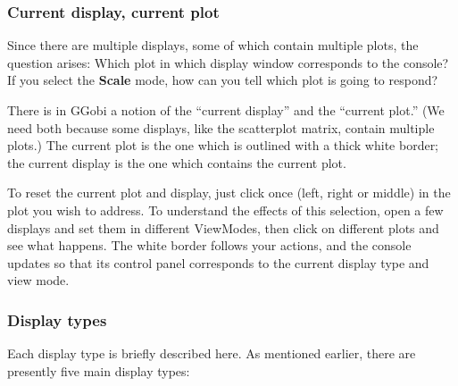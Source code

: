 \documentclass[11pt]{article}
\begin{document}
\subsubsection{Current display, current plot}

Since there are multiple displays, some of which contain multiple
plots, the question arises:  Which plot in which display window
corresponds to the console?  If you select the {\bf Scale} mode,
how can you tell which plot is going to respond?

There is in GGobi a notion of the ``current display'' and the
``current plot.''  (We need both because some displays, like the
scatterplot matrix, contain multiple plots.) The current plot is the
one which is outlined with a thick white border; the current display
is the one which contains the current plot.

To reset the current plot and display, just click once (left, right
or middle) in the plot you wish to address.  To understand the
effects of this selection, open a few displays and set them in
different ViewModes, then click on different plots and see what
happens.  The white border follows your actions, and the
console updates so that its control panel corresponds to the
current display type and view mode.

\subsubsection{Display types}
\label{DisplayTypes}

Each display type is briefly described here. 
As mentioned earlier, there are presently five main display types:

\end{document}

